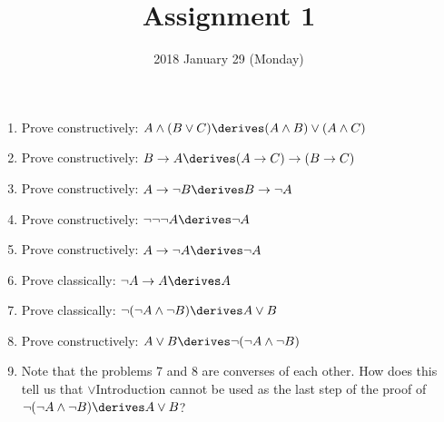 \documentclass{cs81-homework}
\title{Assignment 1}
\author{}
\date{2018 January 29 (Monday)}
\begin{document}
\begin{enumerate}
\item Prove constructively:
  \(A \land (B \lor C) \derives (A \land B) \lor (A \land C)\)

  \begin{solution}
  \end{solution}
  
\item Prove constructively: \(B \to A \derives (A \to C) \to (B \to C)\)

  \begin{solution}
  \end{solution}
  
\item Prove constructively: \(A \to \neg B \derives B \to \neg A\)
  
  \begin{solution}
  \end{solution}
  
\item Prove constructively: \(\neg \neg \neg A \derives \neg A\)
  
  \begin{solution}
  \end{solution}
  
\item Prove constructively: \(A \to \neg A \derives \neg A\)
  
  \begin{solution}
  \end{solution}
  
\item Prove classically: \(\neg A \to A \derives A\)
  
  \begin{solution}
  \end{solution}
  
\item Prove classically: \(\neg (\neg A \land \neg B) \derives A \lor B\)
  
  \begin{solution}
  \end{solution}
  
\item Prove constructively: \(A \lor B \derives \neg (\neg A \land \neg B)\)
  
  \begin{solution}
  \end{solution}
  
\item Note that the problems 7 and 8 are converses of each other.  How does this
  tell us that \(\lor\)Introduction cannot be used as the last step of the proof
  of \(\neg (\neg A \land \neg B) \derives A \lor B\)?
  

\end{enumerate}
\end{document}
